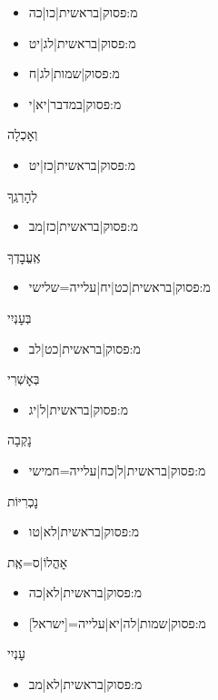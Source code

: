 \begin{itemize}
{{{{{{{{{{\begin{itemize} \item {{מ:פסוק|בראשית|כו|כה}}\item {{מ:פסוק|בראשית|לג|יט}}\item {{מ:פסוק|שמות|לג|ח}}\item {{מ:פסוק|במדבר|יא|י}}
\end{itemize}
 \item וְאׇכְלָה
\begin{itemize} \item {{מ:פסוק|בראשית|כז|יט}}
\end{itemize}
 \item לְהׇרְגֶֽךָ
\begin{itemize} \item {{מ:פסוק|בראשית|כז|מב}}
\end{itemize}
 \item אֶֽעֱבׇדְךָ
\begin{itemize} \item {{מ:פסוק|בראשית|כט|יח|עלייה=שלישי}}
\end{itemize}
 \item בְּעׇנְיִי
\begin{itemize} \item {{מ:פסוק|בראשית|כט|לב}}
\end{itemize}
 \item בְּאׇשְׁרִי
\begin{itemize} \item {{מ:פסוק|בראשית|ל|יג}}
\end{itemize}
 \item נׇקְבָה
\begin{itemize} \item {{מ:פסוק|בראשית|ל|כח|עלייה=חמישי}}
\end{itemize}
 \item נׇכְרִיּוֹת
\begin{itemize} \item {{מ:פסוק|בראשית|לא|טו}}
\end{itemize}
 \item אׇהֳלוֹ|ס=אֶֽת
\begin{itemize} \item {{מ:פסוק|בראשית|לא|כה}}\item {{מ:פסוק|שמות|לה|יא|עלייה=[ישראל]}}
\end{itemize}
 \item עׇנְיִי
\begin{itemize} \item {{מ:פסוק|בראשית|לא|מב}}
\end{itemize}
}}}}}}}}}}
\end{itemize}
